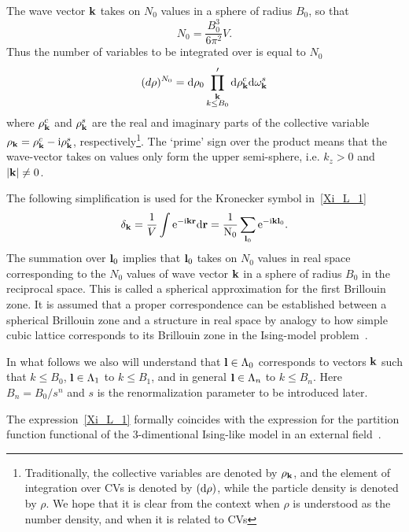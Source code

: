 The wave vector $\vb k$ takes on $N_0$ values in a sphere of radius $B_0$, so that
\begin{equation}
	\label{def:NB}
	N_0 = \frac{B_0^3}{6\pi^2}V.
\end{equation}
Thus the number of variables to be integrated over is equal to $N_0$
\begin{equation*}
	(d\rho)^{N_0} = {\rm d}\rho_0 \prod_{\substack{\vb k \\ k\le B_0}}' {\rm d}\rho_{\vb k}^c {\rm d}\omega_{\vb k}^s
\end{equation*}
where $\rho_{\vb k}^c$ and $\rho_{\vb k}^s$ are the real and imaginary parts of the collective variable $\rho_{\vb k} = \rho_{\vb k}^c - {\rm i} \rho_{\vb k}^s$, respectively\footnote{Traditionally, the collective variables are denoted by $\rho_{\vb k}$, and the element of integration over CVs is denoted by $({\rm d} \rho)$, while the particle density is denoted by $\rho$. We hope that it is clear from the context when $\rho$ is understood as the number density, and when it is related to CVs}. The `prime' sign over the product means that the wave-vector takes on values only form the upper semi-sphere, i.e. $k_z > 0$ and $\abs{\vb k} \neq 0$.

The following simplification is used for the Kronecker symbol in~\eqref{Xi_L_1}
\begin{equation*}
	\delta_{\vb k} = \frac{1}{V} \int \rm{e}^{-{\rm i} \vb k \vb r} \rm{d} \vb r = \frac{1}{N_0}\sum_{\vb l_0} {\rm e}^{-{\rm i} \vb k \vb l_0}.
\end{equation*}
The summation over $\vb l_0$ implies that $\vb l_0$ takes on $N_0$ values in real space corresponding to the $N_0$ values of wave vector $\vb k$ in a sphere of radius $B_0$ in the reciprocal space. This is called a spherical approximation for the first Brillouin zone. It is assumed that a proper correspondence can be established between a spherical Brillouin zone and a structure in real space by analogy to how simple cubic lattice corresponds to its Brillouin zone in the Ising-model problem~\cite{Yukh2001book}. 

In what follows we also will understand that $\vb l \in \Lambda_0$ corresponds to vectors $\vb k$ such that $k \leq B_0$, $\vb l \in \Lambda_1$ to $k \leq B_1$, and in general $\vb l \in \Lambda_n$ to $k \leq B_n$. Here $B_n = B_0/s^n$ and $s$ is the renormalization parameter to be introduced later.

The expression~\eqref{Xi_L_1} formally coincides with the expression for the partition function functional of the 3-dimentional Ising-like model in an external field~\cite{Mpk2012book,MpkRoma2012}. 

